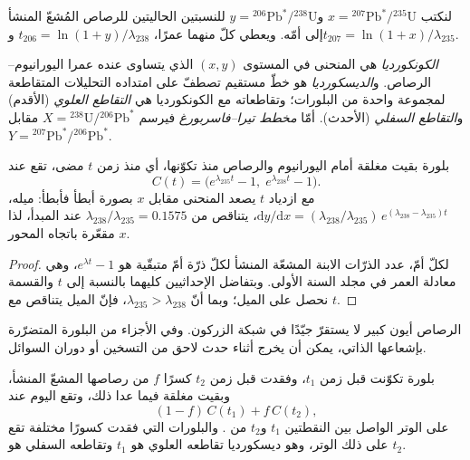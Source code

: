 لنكتب $x = {}^{207}\mathrm{Pb}^*/{}^{235}\mathrm{U}$ و$y =
{}^{206}\mathrm{Pb}^*/{}^{238}\mathrm{U}$ للنسبتين الحاليتين للرصاص المُشعّ المنشأ إلى أمّه.
ويعطي كلّ منهما عمرًا، $t_{206} = \ln(1 + y)/\lambda_{238}$
و$t_{207} = \ln(1 + x)/\lambda_{235}$.

\begin{definition}
\label{def:b3:advanced-geochronology:concordia}
\emph{الكونكورديا} هي المنحنى في المستوى $(x, y)$
الذي يتساوى عنده عمرا اليورانيوم--الرصاص. و\emph{الديسكورديا}
هو خطّ مستقيم تصطفّ على امتداده التحليلات المتقاطعة لمجموعة واحدة من البلورات؛
وتقاطعاته مع الكونكورديا هي
\emph{التقاطع العلوي} (الأقدم)
و\emph{التقاطع السفلي} (الأحدث).
أمّا \emph{مخطط تيرا--فاسربورغ} فيرسم
$X = {}^{238}\mathrm{U}/{}^{206}\mathrm{Pb}^*$ مقابل $Y =
{}^{207}\mathrm{Pb}^*/{}^{206}\mathrm{Pb}^*$.
\end{definition}

\begin{theorem}[الكونكورديا]\label{thm:b3:advanced-geochronology:concordia}
بلورة بقيت مغلقة أمام اليورانيوم والرصاص منذ تكوّنها، أي منذ زمن
$t$ مضى، تقع عند
\[
C(t) = \bigl(e^{\lambda_{235}t} - 1,\; e^{\lambda_{238}t} - 1\bigr).
\]
مع ازدياد $t$ يصعد المنحنى مقابل $x$ بصورة أبطأ فأبطأ: ميله،
$\mathrm dy/\mathrm dx = (\lambda_{238}/\lambda_{235})\,e^{(\lambda_{238} -
\lambda_{235})t}$، يتناقص من $\lambda_{238}/\lambda_{235} = 0.1575$ عند
المبدأ، لذا  مقعّرة باتجاه المحور $x$.
\end{theorem}

\begin{proof}
لكلّ أمّ، عدد الذرّات الابنة المشعّة المنشأ لكلّ ذرّة أمّ متبقّية هو
$e^{\lambda t} - 1$، وهي معادلة العمر في مجلد السنة الأولى. وبتفاضل
الإحداثيين كليهما بالنسبة إلى $t$ والقسمة نحصل على الميل؛ وبما أنّ
$\lambda_{235} > \lambda_{238}$، فإنّ الميل يتناقص مع $t$.
\end{proof}

الرصاص أيون كبير لا يستقرّ جيّدًا في شبكة الزركون. وفي الأجزاء من
البلورة المتضرّرة بإشعاعها الذاتي، يمكن أن يخرج أثناء حدث لاحق من
التسخين أو دوران السوائل.

\begin{theorem}\label{thm:b3:advanced-geochronology:discordia}
بلورة تكوّنت قبل زمن $t_1$، وفقدت قبل زمن $t_2$ كسرًا $f$
من رصاصها المشعّ المنشأ، وبقيت مغلقة فيما عدا ذلك، وتقع اليوم عند
\[
(1 - f)\,C(t_1) + f\,C(t_2),
\]
على الوتر الواصل بين النقطتين $t_1$ و$t_2$ من . والبلورات التي
فقدت كسورًا مختلفة تقع على ذلك الوتر، وهو ديسكورديا تقاطعه العلوي
هو $t_1$ وتقاطعه السفلي هو $t_2$.
\end{theorem}

